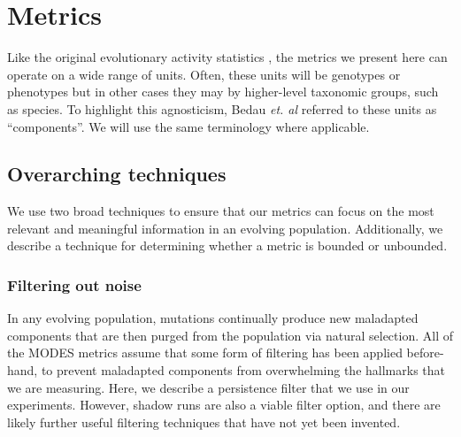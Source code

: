 \documentclass[letterpaper]{article}
\begin{document}
\section{Metrics}

Like the original evolutionary activity statistics \citep{bedau_comparison_1997}, the metrics we present here can operate on a wide range of units. Often, these units will be genotypes or phenotypes but in other cases they may by higher-level taxonomic groups, such as species. To highlight this agnosticism, Bedau \textit{et. al} referred to these units as ``components''. We will use the same terminology where applicable.


\subsection{Overarching techniques}

We use two broad techniques to ensure that our metrics can focus on the most relevant and meaningful information in an evolving population. Additionally, we describe a technique for determining whether a metric is bounded or unbounded. 

\subsubsection{Filtering out noise}

In any evolving population, mutations continually produce new maladapted components that are then purged from the population via natural selection. All of the MODES metrics assume that some form of filtering has been applied before-hand, to prevent maladapted components from overwhelming the hallmarks that we are measuring. Here, we describe a persistence filter that we use in our experiments. However, shadow runs are also a viable filter option, and there are likely further useful filtering techniques that have not yet been invented.
\end{document}
